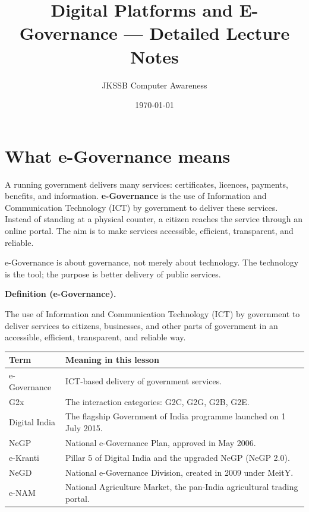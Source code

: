 \documentclass[11pt]{article}
\title{Digital Platforms and E-Governance --- Detailed Lecture Notes}
\author{JKSSB Computer Awareness}
\date{\today}
\newenvironment{definitionbox}[1]{%
  \par\noindent\textbf{Definition (#1).}\ \itshape
}{\par\vspace{0.3em}}
\begin{document}
\maketitle

\section{What e-Governance means}
A running government delivers many services: certificates, licences,
payments, benefits, and information. \textbf{e-Governance} is the use of
Information and Communication Technology (ICT) by government to deliver
these services. Instead of standing at a physical counter, a citizen reaches
the service through an online portal. The aim is to make services
accessible, efficient, transparent, and reliable.

e-Governance is about governance, not merely about technology. The
technology is the tool; the purpose is better delivery of public services.

\begin{definitionbox}{e-Governance}
The use of Information and Communication Technology (ICT) by government to
deliver services to citizens, businesses, and other parts of government in
an accessible, efficient, transparent, and reliable way.
\end{definitionbox}

\begin{center}
\begin{tabular}{p{}p{}}
\toprule
\textbf{Term} & \textbf{Meaning in this lesson} \\
\midrule
e-Governance & ICT-based delivery of government services. \\
G2x & The interaction categories: G2C, G2G, G2B, G2E. \\
Digital India & The flagship Government of India programme launched on 1 July 2015. \\
NeGP & National e-Governance Plan, approved in May 2006. \\
e-Kranti & Pillar 5 of Digital India and the upgraded NeGP (NeGP 2.0). \\
NeGD & National e-Governance Division, created in 2009 under MeitY. \\
e-NAM & National Agriculture Market, the pan-India agricultural trading portal. \\
\bottomrule
\end{tabular}
\end{center}
\end{document}
